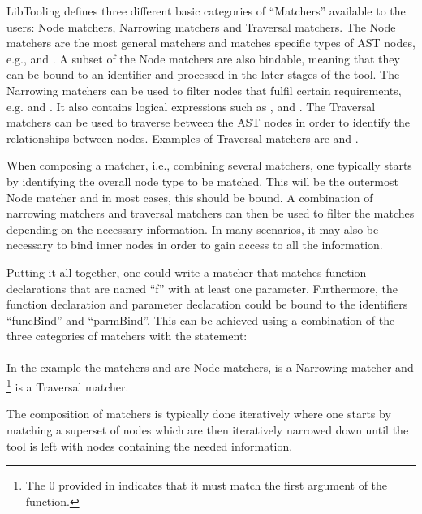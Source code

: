 LibTooling defines three different basic categories of ``Matchers'' available to the users: Node matchers, Narrowing matchers and Traversal matchers.
The Node matchers are the most general matchers and matches specific types of AST nodes, e.g.,  and . A subset of the Node matchers are also bindable, meaning that they can be bound to an identifier and processed in the later stages of the tool.
The Narrowing matchers can be used to filter nodes that fulfil certain requirements, e.g.  and . It also contains logical expressions such as , and .
The Traversal matchers can be used to traverse between the AST nodes in order to identify the relationships between nodes.
Examples of Traversal matchers are  and  \cite{clangASTMatcherReference}.

When composing a matcher, i.e., combining several matchers, one typically starts by identifying the overall node type to be matched. This will be the outermost Node matcher and in most cases, this should be bound.
A combination of narrowing matchers and traversal matchers can then be used to filter the matches depending on the necessary information.
In many scenarios, it may also be necessary to bind inner nodes in order to gain access to all the information.

Putting it all together, one could write a matcher that matches function declarations that are named ``f'' with at least one parameter. Furthermore, the function declaration and parameter declaration could be bound to the identifiers ``funcBind'' and ``parmBind''.
This can be achieved using a combination of the three categories of matchers with the statement:\\ \\
In the example the matchers  and  are Node matchers,  is a Narrowing matcher and \footnote{The 0 provided in  indicates that it must match the first argument of the function.} is a Traversal matcher.

The composition of matchers is typically done iteratively where one starts by matching a superset of nodes which are then iteratively narrowed down until the tool is left with nodes containing the needed information. 

